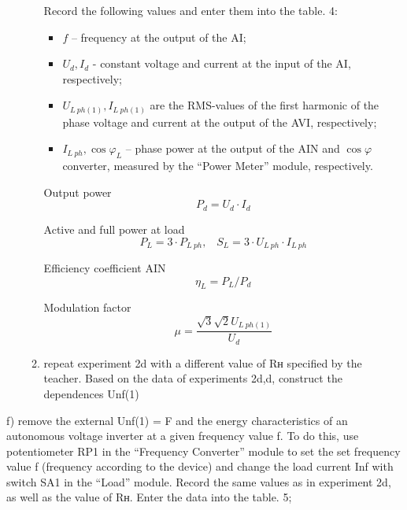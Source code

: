 \documentclass[a4paper,14pt]{article}
\begin{document}
\begin{enumerate}
\begin{enumerate}
Record the following values and enter them into the table. 4:

\begin{itemize}
\item $f$ -- frequency at the output of the AI;

\item $U_d,I_d$ - constant voltage and current at the input of the AI, respectively;

\item $U_{L\:ph(1)}, I_{L\:ph(1)}$ are the RMS-values of the first harmonic of the phase voltage and current at the output of the AVI, respectively;

\item $I_{L\:ph}, \cos\varphi_L$  -- phase power at the output of the AIN and $\cos\varphi$ converter, measured by the “Power Meter” module, respectively.
\end{itemize}

Output power
\begin{equation}
P_d = U_d\cdot I_d
\end{equation}

Active and full power at load
\begin{equation}
P_L = 3\cdot P_{L\:ph},\;\;\; S_L = 3\cdot U_{L\:ph}\cdot I_{L\:ph}
\end{equation}
 

Efficiency coefficient AIN
\begin{equation}
\eta_L = P_L/P_d
\end{equation}


Modulation factor
\begin{equation}
\mu = \frac{\sqrt{3}\sqrt{2}U_{L\:ph(1)}}{U_d}
\end{equation}



\item repeat experiment 2d with a different value of Rн specified by the teacher. Based on the data of experiments 2d,d, construct the dependences Unf(1)


\end{enumerate}
\end{enumerate}

f) remove the external Unf(1) = F and the energy characteristics of an autonomous voltage inverter at a given frequency value f. To do this, use potentiometer RP1 in the “Frequency Converter” module to set the set frequency value f (frequency according to the device) and change the load current Inf with switch SA1 in the “Load” module. Record the same values as in experiment 2d, as well as the value of Rн.
Enter the data into the table. 5;
\end{document}

